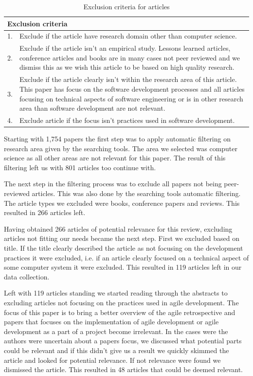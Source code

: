 \documentclass[12pt]{article}
\begin{document}
\begin{table}[h!]
	\begin{center}
		\caption{Exclusion criteria for articles}
		\label{table:datacriteria}
		\begin{tabular}{l p{}}
		 	\multicolumn{2}{l}{Exclusion criteria}\\
		 	\hline
			1. & Exclude if the article have research domain other than computer science. \\
			2. & Exclude if the article isn't an empirical study. Lessons learned articles, conference articles and books are in many cases not peer reviewed and we dismiss this as we wish this article to be based on high quality research. \\
			3. & Exclude if the article clearly isn't within the research area of this article. This paper has focus on the software development processes and all articles focusing on technical aspects of software engineering or is in other research area than software development are not relevant. \\
			4. & Exclude article if the focus isn't practices used in software development. \\
		\end{tabular}
	\end{center}
\end{table}

Starting with 1,754 papers the first step was to apply automatic filtering on research area given by the searching tools. The area we selected was computer science as all other areas are not relevant for this paper. The result of this filtering left us with 801 articles too continue with. 

The next step in the filtering process was to exclude all papers not being peer-reviewed articles. This was also done by the searching tools automatic filtering. The article types we excluded were books, conference papers and reviews. This resulted in 266 articles left. 

Having obtained 266 articles of potential relevance for this review, excluding articles not fitting our needs became the next step. First we excluded based on title. If the title clearly described the article as not focusing on the development practices it were excluded, i.e. if an article clearly focused on a technical aspect of some computer system it were excluded. This resulted in 119 articles left in our data collection. 

Left with 119 articles standing we started reading through the abstracts to excluding articles not focusing on the practices used in agile development. The focus of this paper is to bring a better overview of the agile retrospective and papers that focuses on the implementation of agile development or agile development as a part of a project become irrelevant. In the cases were the authors were uncertain about a papers focus, we discussed what potential parts could be relevant and if this didn't give us a result we quickly skimmed the article and looked for potential relevance. If not relevance were found we dismissed the article. This resulted in 48 articles that could be deemed relevant. 
\end{document}
